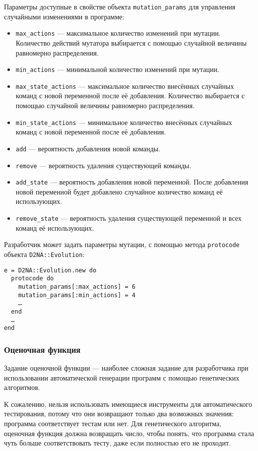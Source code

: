 \documentclass[utf8,a5paper,portrait,12pt]{eskdtext}
\begin{document}
Параметры доступные в свойстве объекта \texttt{mutation\_params} для управления
случайными изменениями в программе:

\begin{itemize}
  \item \texttt{max\_actions} — максимальное количество изменений при мутации.
        Количество действий мутатора выбирается с помощью случайной величины
        равномерно распределения.
  \item \texttt{min\_actions} — минимальной количество изменений при мутации.
  \item \texttt{max\_state\_actions} — максимальное количество внесённых
        случайных команд с новой переменной после её добавления. Количество
        выбирается с помощью случайной величины равномерно распределения.
  \item \texttt{min\_state\_actions} — минимальное количество внесённых
        случайных команд с новой переменной после её добавления.
  \item \texttt{add} — вероятность добавления новой команды.
  \item \texttt{remove} — вероятность удаления существующей команды.
  \item \texttt{add\_state} — вероятность добавления новой переменной. После
        добавления новой переменной будет добавлено случайное количество
        команд её использующих.
  \item \texttt{remove\_state} — вероятность удаления существующей переменной и
        всех команд её использующих.
\end{itemize}

Разработчик может задать параметры мутации, с помощью метода \texttt{protocode}
объекта \texttt{D2NA::Evolution}:

\begin{verbatim}
e = D2NA::Evolution.new do
  protocode do
    mutation_params[:max_actions] = 6
    mutation_params[:min_actions] = 4
    …
  end
  …
end
\end{verbatim}

\subsubsection{Оценочная функция}

Задание оценочной функции — наиболее сложная задание для разработчика при
использовании автоматической генерации программ с помощью генетических
алгоритмов.

К сожалению, нельзя использовать имеющиеся инструменты для автоматического
тестирования, потому что они возвращают только два возможных значения: программа
соответствует тестам или нет. Для генетического алгоритма, оценочная функция
должна возвращать число, чтобы понять, что программа стала чуть больше 
соответствовать тесту, даже если полностью его не проходит.
\end{document}
